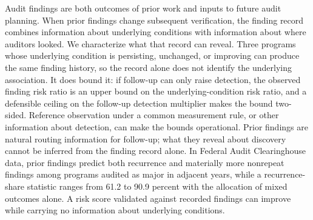\noindent
Audit findings are both outcomes of prior work and inputs to future audit
planning. When prior findings change subsequent verification, the finding
record combines information about underlying conditions with information about
where auditors looked. We characterize what that record can reveal.
Three programs whose underlying condition is persisting, unchanged, or improving
can produce the same finding history, so the record alone does not identify the
underlying association. It does bound it: if follow-up can only raise detection,
the observed finding risk ratio is an upper bound on the underlying-condition
risk ratio, and a defensible ceiling on the follow-up detection multiplier makes
the bound two-sided. Reference observation under a common measurement rule, or
other information about detection, can make the bounds operational. Prior
findings are natural routing information for follow-up; what they reveal about
discovery cannot be inferred from the finding record alone. In Federal Audit
Clearinghouse data, prior findings predict both recurrence and materially more
nonrepeat findings among programs audited as major in adjacent years, while a
recurrence-share statistic ranges from 61.2 to 90.9 percent with the
allocation of mixed outcomes alone. A risk score validated against recorded findings
can improve while carrying no information about underlying conditions.
